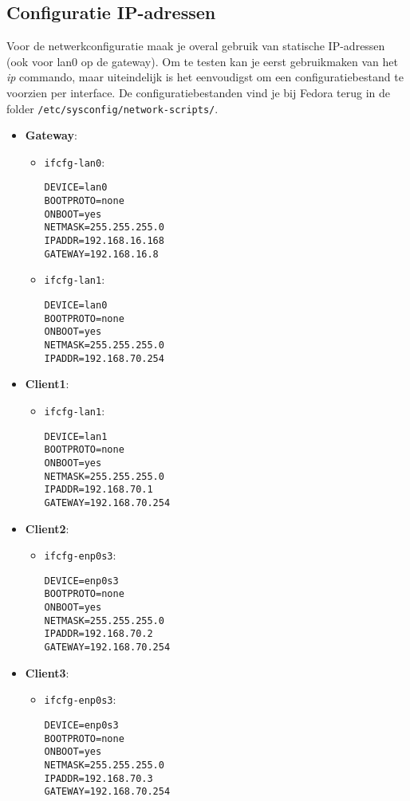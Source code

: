 \documentclass{report}
\begin{document}
\subsection{Configuratie IP-adressen}
Voor de netwerkconfiguratie maak je overal gebruik van statische IP-adressen (ook voor lan0 op de gateway). Om te testen kan je eerst gebruikmaken van het \textit{ip} commando, maar uiteindelijk is het eenvoudigst om een configuratiebestand te voorzien per interface. De configuratiebestanden vind je bij Fedora terug in de folder \texttt{/etc/sysconfig/network-scripts/}. 
\begin{itemize}
	\item \textbf{Gateway}: \begin{itemize}
								\item \texttt{ifcfg-lan0}:
									  		\begin{lstlisting}
DEVICE=lan0
BOOTPROTO=none
ONBOOT=yes
NETMASK=255.255.255.0
IPADDR=192.168.16.168
GATEWAY=192.168.16.8
											\end{lstlisting}
								\item \texttt{ifcfg-lan1}:
\begin{lstlisting}
DEVICE=lan0
BOOTPROTO=none
ONBOOT=yes
NETMASK=255.255.255.0
IPADDR=192.168.70.254
\end{lstlisting}											
							\end{itemize}
	\item \textbf{Client1}: 
	\begin{itemize}
		\item \texttt{ifcfg-lan1}:
		\begin{lstlisting}
DEVICE=lan1
BOOTPROTO=none
ONBOOT=yes
NETMASK=255.255.255.0
IPADDR=192.168.70.1
GATEWAY=192.168.70.254
		\end{lstlisting}										
	\end{itemize}

	\item \textbf{Client2}: 
\begin{itemize}
	\item \texttt{ifcfg-enp0s3}:
	\begin{lstlisting}
DEVICE=enp0s3
BOOTPROTO=none
ONBOOT=yes
NETMASK=255.255.255.0
IPADDR=192.168.70.2
GATEWAY=192.168.70.254
	\end{lstlisting}										
\end{itemize}

	\item \textbf{Client3}: 
\begin{itemize}
	\item \texttt{ifcfg-enp0s3}:
	\begin{lstlisting}
DEVICE=enp0s3
BOOTPROTO=none
ONBOOT=yes
NETMASK=255.255.255.0
IPADDR=192.168.70.3
GATEWAY=192.168.70.254
	\end{lstlisting}										
\end{itemize}

\end{itemize}
\end{document}
